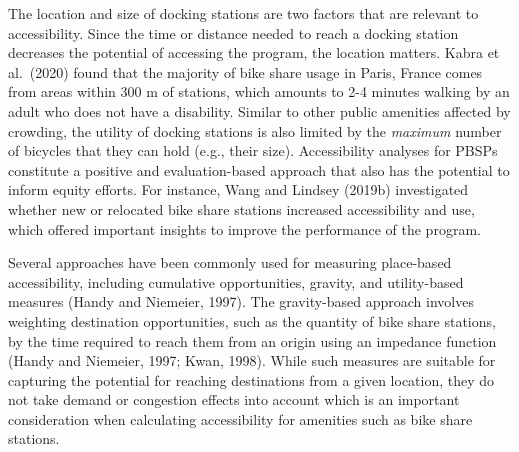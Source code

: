 \documentclass[]{elsarticle} %
\begin{document}
The location and size of docking stations are two factors that are
relevant to accessibility. Since the time or distance needed to reach a
docking station decreases the potential of accessing the program, the
location matters. Kabra et al.~(2020) found that the majority of bike
share usage in Paris, France comes from areas within 300 m of stations,
which amounts to 2-4 minutes walking by an adult who does not have a
disability. Similar to other public amenities affected by crowding, the
utility of docking stations is also limited by the \emph{maximum} number
of bicycles that they can hold (e.g., their size). Accessibility
analyses for PBSPs constitute a positive and evaluation-based approach
that also has the potential to inform equity efforts. For instance, Wang
and Lindsey (2019b) investigated whether new or relocated bike share
stations increased accessibility and use, which offered important
insights to improve the performance of the program.

Several approaches have been commonly used for measuring place-based
accessibility, including cumulative opportunities, gravity, and
utility-based measures (Handy and Niemeier, 1997). The gravity-based
approach involves weighting destination opportunities, such as the
quantity of bike share stations, by the time required to reach them from
an origin using an impedance function (Handy and Niemeier, 1997; Kwan,
1998). While such measures are suitable for capturing the potential for
reaching destinations from a given location, they do not take demand or
congestion effects into account which is an important consideration when
calculating accessibility for amenities such as bike share stations.
\end{document}
